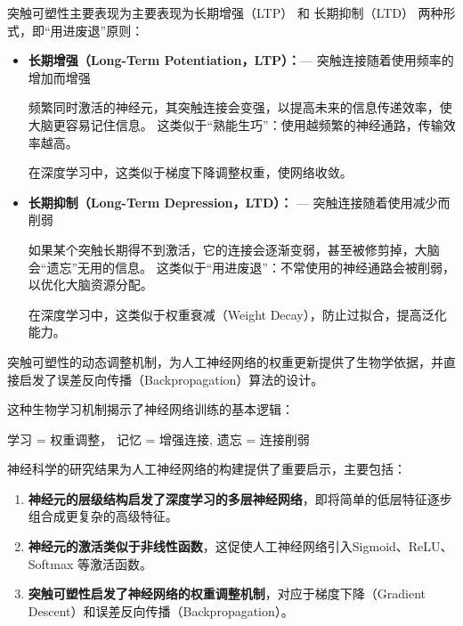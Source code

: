 突触可塑性主要表现为主要表现为长期增强（LTP） 和 长期抑制（LTD） 两种形式，即“用进废退”原则：\begin{itemize}
\item {\bf 长期增强（Long-Term Potentiation，LTP）：}--- 突触连接随着使用频率的增加而增强

频繁同时激活的神经元，其突触连接会变强，以提高未来的信息传递效率，使大脑更容易记住信息。
这类似于“熟能生巧”：使用越频繁的神经通路，传输效率越高。

在深度学习中，这类似于梯度下降调整权重，使网络收敛。

\item {\bf 长期抑制（Long-Term Depression，LTD）：} --- 突触连接随着使用减少而削弱

如果某个突触长期得不到激活，它的连接会逐渐变弱，甚至被修剪掉，大脑会“遗忘”无用的信息。
这类似于“用进废退”：不常使用的神经通路会被削弱，以优化大脑资源分配。

在深度学习中，这类似于权重衰减（Weight Decay），防止过拟合，提高泛化能力。
\end{itemize}

突触可塑性的动态调整机制，为人工神经网络的权重更新提供了生物学依据，并直接启发了误差反向传播（Backpropagation）算法的设计。

这种生物学习机制揭示了神经网络训练的基本逻辑：
\begin{center} 
学习 = 权重调整， \quad 
记忆 = 增强连接, \quad
遗忘 = 连接削弱
\end{center} 


神经科学的研究结果为人工神经网络的构建提供了重要启示，主要包括：

\begin{enumerate}
\item {\bf 神经元的层级结构启发了深度学习的多层神经网络}，即将简单的低层特征逐步组合成更复杂的高级特征。
\item {\bf 神经元的激活类似于非线性函数}，这促使人工神经网络引入Sigmoid、ReLU、Softmax 等激活函数。
\item {\bf 突触可塑性启发了神经网络的权重调整机制}，对应于梯度下降（Gradient Descent）和误差反向传播（Backpropagation）。
\end{enumerate}

